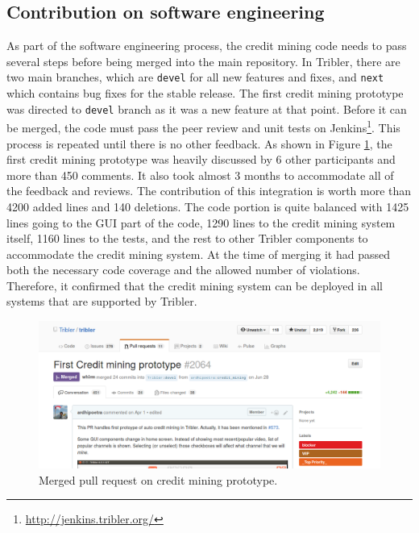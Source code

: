 \subsection{Contribution on software engineering}
As part of the software engineering process, the credit mining code needs to pass several steps before being merged into the main repository. In Tribler, there are two main branches, which are \texttt{devel} for all new features and fixes, and \texttt{next} which contains bug fixes for the stable release. The first credit mining prototype was directed to \texttt{devel} branch as it was a new feature at that point. Before it can be merged, the code must pass the peer review and unit tests on Jenkins\footnote{\url{http://jenkins.tribler.org/}}. This process is repeated until there is no other feedback. As shown in Figure \ref{fig:cmpullrequest}, the first credit mining prototype was heavily discussed by 6 other participants and more than 450 comments. It also took almost 3 months to accommodate all of the feedback and reviews. The contribution of this integration is worth more than 4200 added lines and 140 deletions. The code portion is quite balanced with 1425 lines going to the GUI part of the code, 1290 lines to the credit mining system itself, 1160 lines to the tests, and the rest to other Tribler components to accommodate the credit mining system. At the time of merging it had passed both the necessary code coverage and the allowed number of violations. Therefore, it confirmed that the credit mining system can be deployed in all systems that are supported by Tribler. 

\begin{figure}[h]
	\centering
	\includegraphics[width=\textwidth]{pics/cm_pr_crop.png}
	\caption[Merged pull request on credit mining prototype]{Merged pull request on credit mining prototype\footnotemark.}
	\label{fig:cmpullrequest}
\end{figure}

